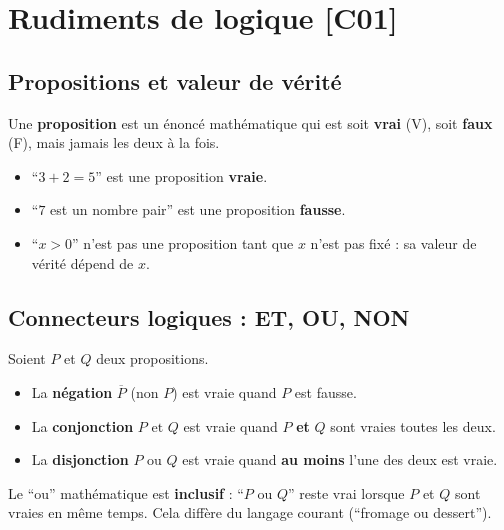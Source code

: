 \documentclass[a4paper,11pt]{article}
\begin{document}
\newpage
\section{Rudiments de logique \hfill {\normalsize\color{uimmred}[C01]}}

\subsection{Propositions et valeur de vérité}

\begin{definition}
Une \textbf{proposition} est un énoncé mathématique qui est soit \textbf{vrai} (V), soit \textbf{faux} (F), mais jamais les deux à la fois.
\end{definition}

\begin{exemple}[-- Propositions]
\begin{itemize}
  \item ``$3 + 2 = 5$'' est une proposition \textbf{vraie}.
  \item ``$7$ est un nombre pair'' est une proposition \textbf{fausse}.
  \item ``$x > 0$'' n'est pas une proposition tant que $x$ n'est pas fixé : sa valeur de vérité dépend de $x$.
\end{itemize}
\end{exemple}

\subsection{Connecteurs logiques : ET, OU, NON}

\begin{definition}
Soient $P$ et $Q$ deux propositions.
\begin{itemize}
  \item La \textbf{négation} $\overline{P}$ (non $P$) est vraie quand $P$ est fausse.
  \item La \textbf{conjonction} $P \text{ et } Q$ est vraie quand $P$ \textbf{et} $Q$ sont vraies toutes les deux.
  \item La \textbf{disjonction} $P \text{ ou } Q$ est vraie quand \textbf{au moins} l'une des deux est vraie.
\end{itemize}
\end{definition}

\begin{remarque}
Le ``ou'' mathématique est \textbf{inclusif} : ``$P$ ou $Q$'' reste vrai lorsque $P$ et $Q$ sont vraies en même temps. Cela diffère du langage courant (``fromage ou dessert'').
\end{remarque}
\end{document}
